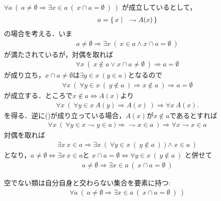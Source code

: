 	\begin{prf}
		$\forall a\ \left(\ a \neq \emptyset \Longrightarrow 
		\exists x \in a\ (\ x \cap a = \emptyset\ )\ \right)$
		が成立しているとして，
		\begin{align}
			a = \left\{\, x \mid \quad \rightharpoondown A(x)\, \right\}
		\end{align}
		の場合を考える．いま
		\begin{align}
			a \neq \emptyset \Longrightarrow 
			\exists x\ (\ x \in a \wedge x \cap a = \emptyset\ )
		\end{align}
		が満たされているが，対偶を取れば
		\begin{align}
			\forall x\ (\ x \notin a \vee x \cap a \neq \emptyset\ )
			\Longrightarrow a = \emptyset
		\end{align}
		が成り立ち，$x \cap a \neq \emptyset$は$\exists y \in x\ (y \in a)$となるので
		\begin{align}
			\forall x\ (\ \forall y \in x\ (\ y \notin a\ ) \Longrightarrow x \notin a\ )
			\Longrightarrow a = \emptyset
		\end{align}
		が成立する．ところで$x \notin a \Longleftrightarrow A(x)$より
		\begin{align}
			\forall x\ \left(\ \forall y \in x\ A(y)
			\Longrightarrow A(x)\ \right)
			\Longrightarrow \forall x\ A(x).
			\label{eq:thm_equivalent_condition_of_axiom_of_regularity_1}
		\end{align}
		を得る．逆に()が成り立っている場合，$A(x)$が$x \notin a$であるとすれば
		\begin{align}
			\forall x\ \left(\ \forall y \in x \rightharpoondown y \in a\ )
			\Longrightarrow \rightharpoondown x \in a\ \right)
			\Longrightarrow \forall x \rightharpoondown x \in a
		\end{align}
		対偶を取れば
		\begin{align}
			\exists x\ x \in a \Longrightarrow 
			\exists x\ \left(\ \forall y \in x\ (\ y \notin a\ )\ )
			\wedge x \in a\ \right)
		\end{align}
		となり，$a \neq \emptyset \Longleftrightarrow \exists x\ x \in a$と
		$x \cap a = \emptyset \Longleftrightarrow \forall y \in x\ (\ y \notin a\ )$
		と併せて
		\begin{align}
			a \neq \emptyset \Longrightarrow 
			\exists x \in a\ (\ x \cap a = \emptyset\ )
		\end{align}
	\end{prf}
	
	\begin{screen}
		\begin{axm}[正則性公理]
			空でない類は自分自身と交わらない集合を要素に持つ:
			\begin{align}
				\forall a\ \left(\ a \neq \emptyset \Longrightarrow 
				\exists x \in a\ (\ x \cap a = \emptyset\ )\ \right)
			\end{align}
		\end{axm}
	\end{screen}
	
